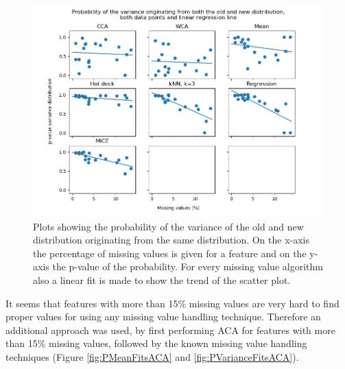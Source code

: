 \documentclass[10pt,a4paper]{article}
\begin{document}
	\begin{figure}[H]
		\centering
		\includegraphics[width=\textwidth]{Var_Dist.PNG}
		\caption{Plots showing the probability of the variance of the old and new distribution originating from the same distribution. On the x-axis the percentage of missing values is given for a feature and on the y-axis the p-value of the probability. For every missing value algorithm also a linear fit is made to show the trend of the scatter plot.}
		\label{fig:PVarianceFits}
	\end{figure}
	
	It seems that features with more than 15\% missing values are very hard to find proper values for using any missing value handling technique. Therefore an additional approach was used, by first performing ACA for features with more than 15\% missing values, followed by the known missing value handling techniques (Figure \ref{fig:PMeanFitsACA} and \ref{fig:PVarianceFitsACA}). 
	
\end{document}
